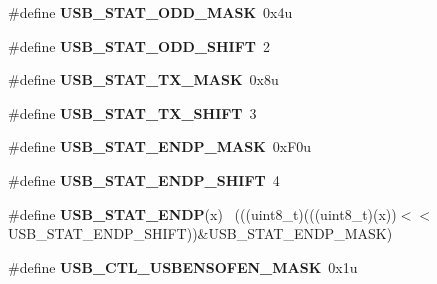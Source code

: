 \begin{DoxyCompactItemize}
\item 
\hypertarget{group___u_s_b___register___masks_ga49caa3c5b36fc89eadadd60cdf331643}{}\#define {\bfseries U\+S\+B\+\_\+\+S\+T\+A\+T\+\_\+\+O\+D\+D\+\_\+\+M\+A\+S\+K}~0x4u\label{group___u_s_b___register___masks_ga49caa3c5b36fc89eadadd60cdf331643}

\item 
\hypertarget{group___u_s_b___register___masks_ga15f3e2fa671ea1a59e0b24a9697faf8a}{}\#define {\bfseries U\+S\+B\+\_\+\+S\+T\+A\+T\+\_\+\+O\+D\+D\+\_\+\+S\+H\+I\+F\+T}~2\label{group___u_s_b___register___masks_ga15f3e2fa671ea1a59e0b24a9697faf8a}

\item 
\hypertarget{group___u_s_b___register___masks_gab953f904ef3a2b838a922ebdf69cf140}{}\#define {\bfseries U\+S\+B\+\_\+\+S\+T\+A\+T\+\_\+\+T\+X\+\_\+\+M\+A\+S\+K}~0x8u\label{group___u_s_b___register___masks_gab953f904ef3a2b838a922ebdf69cf140}

\item 
\hypertarget{group___u_s_b___register___masks_ga5173e8423017932d90919ddb18f918bd}{}\#define {\bfseries U\+S\+B\+\_\+\+S\+T\+A\+T\+\_\+\+T\+X\+\_\+\+S\+H\+I\+F\+T}~3\label{group___u_s_b___register___masks_ga5173e8423017932d90919ddb18f918bd}

\item 
\hypertarget{group___u_s_b___register___masks_gad8a184e838de511e23aa32011fc9f0b6}{}\#define {\bfseries U\+S\+B\+\_\+\+S\+T\+A\+T\+\_\+\+E\+N\+D\+P\+\_\+\+M\+A\+S\+K}~0x\+F0u\label{group___u_s_b___register___masks_gad8a184e838de511e23aa32011fc9f0b6}

\item 
\hypertarget{group___u_s_b___register___masks_ga5d85a4b028002bc9ce0f1650111cd49a}{}\#define {\bfseries U\+S\+B\+\_\+\+S\+T\+A\+T\+\_\+\+E\+N\+D\+P\+\_\+\+S\+H\+I\+F\+T}~4\label{group___u_s_b___register___masks_ga5d85a4b028002bc9ce0f1650111cd49a}

\item 
\hypertarget{group___u_s_b___register___masks_gad3e8103c4490cdec9585e10998f3e4b2}{}\#define {\bfseries U\+S\+B\+\_\+\+S\+T\+A\+T\+\_\+\+E\+N\+D\+P}(x)                                              ~(((uint8\+\_\+t)(((uint8\+\_\+t)(x))$<$$<$U\+S\+B\+\_\+\+S\+T\+A\+T\+\_\+\+E\+N\+D\+P\+\_\+\+S\+H\+I\+F\+T))\&U\+S\+B\+\_\+\+S\+T\+A\+T\+\_\+\+E\+N\+D\+P\+\_\+\+M\+A\+S\+K)\label{group___u_s_b___register___masks_gad3e8103c4490cdec9585e10998f3e4b2}

\item 
\hypertarget{group___u_s_b___register___masks_gaa406be72ac0b31143d3a3bc357af334b}{}\#define {\bfseries U\+S\+B\+\_\+\+C\+T\+L\+\_\+\+U\+S\+B\+E\+N\+S\+O\+F\+E\+N\+\_\+\+M\+A\+S\+K}~0x1u\label{group___u_s_b___register___masks_gaa406be72ac0b31143d3a3bc357af334b}


\end{DoxyCompactItemize}
